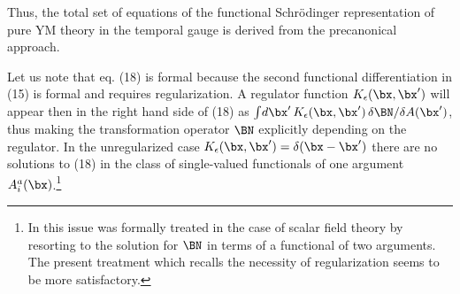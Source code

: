 \documentclass[12pt]{article}
\begin{document}
Thus, the total set of equations of the functional 
Schr\"odinger representation of pure YM theory in the temporal gauge 
is derived  from the precanonical approach. 


Let us note that eq. (18) is formal because the second 
functional differentiation in (15) is formal and requires regularization. 
A regulator function 
$K_\epsilon(\bx,\bx')$ will appear then in the right hand side 
of (18) as 
$\int\! d\bx'\, K_\epsilon(\bx,\bx')\, \delta \BN/\delta A(\bx')$, 
thus making the transformation operator $\BN$ explicitly depending 
on the regulator. In the unregularized case $K_\epsilon(\bx,\bx') = 
\delta(\bx-\bx')$ there are no solutions to (18) 
in the class 
of single-valued functionals of one argument 
$A^a_i(\bx)$.\footnote{In \cite{pla2001} this 
issue was formally treated in the case 
of scalar field theory by resorting to the solution for $\BN$ in terms 
of a functional of two arguments. The present treatment which 
recalls the necessity of regularization seems to be more satisfactory.}  



\newcommand{\integrability}{
We still have to check if () has solutions. The integrability check 
obtained by functional differentiation of both sides of () 
with respect to $A_d^k(\bx')$ and subsequent antisymmetrization 
 yields: 
\beqa
&&\frac{\delta }{\delta A_d^k(\bx')}\frac{\delta \BN}{\delta A_a^j(\bx)} 
- \frac{\delta }{\delta A_a^j(\bx)} \frac{\delta\BN}{\delta A_d^k(\bx')}
= 
\gamma^i 
\left (\frac{\der}{\der x^{[i}} \delta(\bx-\bx') 
- \frac{\der}{\der x'{}^{[i}} \delta (\bx'-\bx)\right ) 
\delta_{j]k} \delta^{ad} \nn \\ 
&&... ???? 
\eeqa

...

\beq
\BN [A(\bx), F(\bx)]
= \half \int\!d\bx \gamma^i F^a_{ij}(\bx) A_a^j(\bx) ?????? 
\eeq
where the field strength variables $F^a_{ij}$ are considered 
as independent from the potentials $A_a^j(\bx)$. 

gauge condition ... Gauss law ..... 

... ?????? 

\beq
\int\!d\bx 
\left ( \der_i \frac{\delta}{\delta A_{ai}}   
+? g C^a_{bc} A^b_i \frac{\delta}{\delta A_{ci}}
\right ) \BPsi
\eeq

How to implement gauge conditions precanonically?????? 

} 
\end{document}
